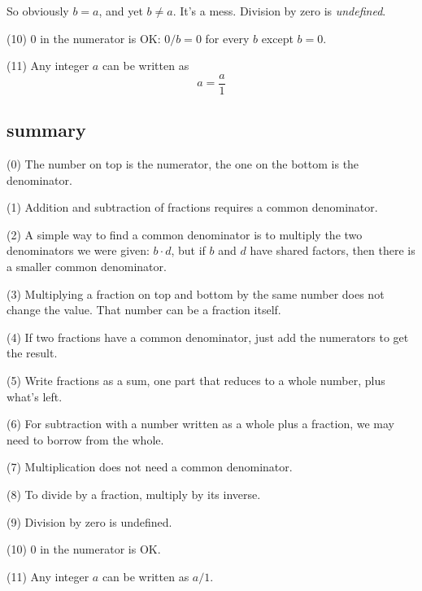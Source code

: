 \documentclass[11pt, oneside]{article}
\begin{document}
So obviously $b = a$, and yet $b \ne a$.  It's a mess. Division by zero is \emph{undefined}.

(10) $0$ in the numerator is OK:  $0/b = 0$ for every $b$ except $b = 0$.

(11) Any integer $a$ can be written as
\[ a = \frac{a}{1} \]

\subsection*{summary}

(0) The number on top is the numerator, the one on the bottom is the denominator.

(1) Addition and subtraction of fractions requires a common denominator.

(2) A simple way to find a common denominator is to multiply the two denominators we were given:  $b \cdot d$, but if $b$ and $d$ have shared factors, then there is a smaller common denominator.

(3) Multiplying a fraction on top and bottom by the same number does not change the value.  That number can be a fraction itself.

(4) If two fractions have a common denominator, just add the numerators to get the result.

(5) Write fractions as a sum, one part that reduces to a whole number, plus what's left.

(6) For subtraction with a number written as a whole plus a fraction, we may need to borrow from the whole.

(7) Multiplication does not need a common denominator.  

(8) To divide by a fraction, multiply by its inverse.

(9) Division by zero is undefined.

(10) $0$ in the numerator is OK.

(11) Any integer $a$ can be written as $a/1$.
\end{document}
